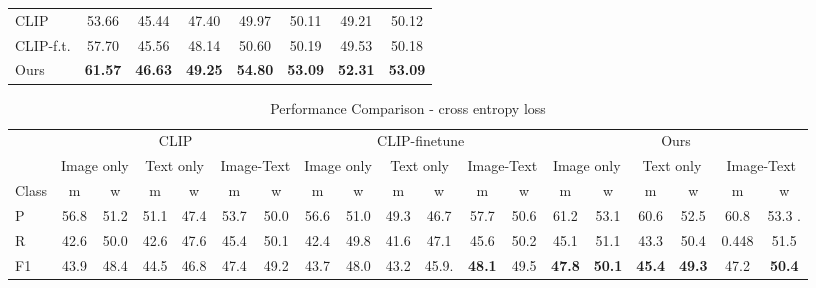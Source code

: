 \begin{table}
\begin{tabular}{lccccccc}
    CLIP & 53.66 & 45.44 & 47.40 & 49.97 & 50.11 & 49.21 & 50.12   \\
    CLIP-f.t. & 57.70 & 45.56 & 48.14 & 50.60 & 50.19 & 49.53 & 50.18 \\

    Ours & \textbf{61.57} & \textbf{46.63} & \textbf{49.25} & \textbf{54.80} & \textbf{53.09} & \textbf{52.31} & \textbf{53.09} \\
    \hline
    \end{tabular}    
\end{table}



\begin{table*}
    \centering
    \caption{Performance Comparison - cross entropy loss}
    \label{tab: baselines}

    \begin{tabular}{l|cc|cc|cc|cc|cc|cc|cc|cc|cc }
    \hline

             & \multicolumn{6}{c|}{CLIP} 
             & \multicolumn{6}{c|}{CLIP-finetune} 
             & \multicolumn{6}{c}{Ours} \\ 
        \cline{2-19}
            & \multicolumn{2}{c}{Image only} 
             & \multicolumn{2}{c}{Text only} 
             & \multicolumn{2}{c|}{Image-Text} 
             & \multicolumn{2}{c}{Image only} 
             & \multicolumn{2}{c}{Text only} 
             & \multicolumn{2}{c|}{Image-Text}
             & \multicolumn{2}{c}{Image only} 
             & \multicolumn{2}{c}{Text only} 
             & \multicolumn{2}{c}{Image-Text} \\
             \cline{2-19}
        Class & m&w& m&w& m&w& m&w& m&w& m&w& m&w& m&w& m&w   \\ 
        \hline
        P &56.8 &  51.2  &51.1 & 47.4 & 53.7  &50.0 & 56.6 & 51.0  & 49.3  & 46.7 &57.7 & 50.6 & 61.2 & 53.1  &60.6 & 52.5 & 60.8  &53.3 .\\
        R      &42.6 & 50.0 & 42.6 & 47.6  &45.4 & 50.1 & 42.4  &49.8 & 41.6 & 47.1  &45.6 & 50.2 & 45.1 & 51.1  &43.3 & 50.4 & 0.448  &51.5 \\
        F1 &43.9 & 48.4 & 44.5 & 46.8  &47.4 & 49.2 & 43.7  & 48.0 & 43.2 & 45.9.  &\textbf{48.1} & 49.5 & \textbf{47.8} & \textbf{50.1}  &\textbf{45.4} & \textbf{49.3} & 47.2  & \textbf{50.4} \\ 
        \hline
        
    \end{tabular}    
\end{table*}

